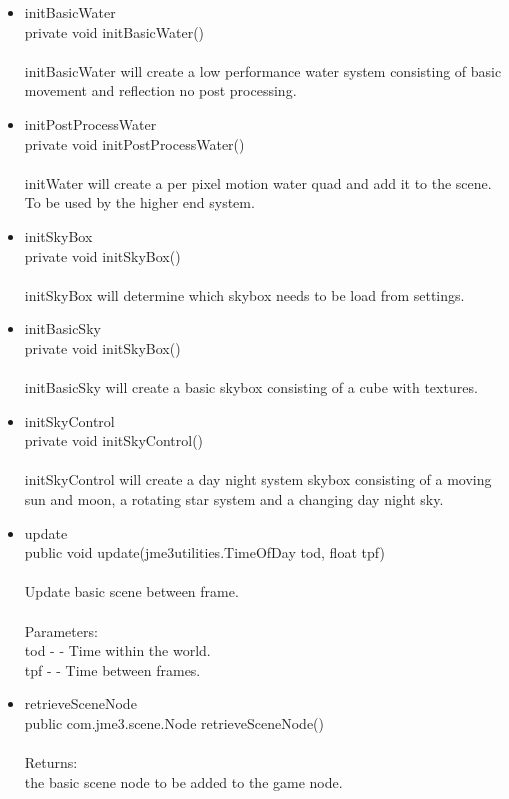 \documentclass[letterpaper]{article}
\begin{document}
\begin{itemize}
\begin{itemize}
											\item	initBasicWater \\
													private void initBasicWater() \\ \\
													initBasicWater will create a low performance water system consisting of basic movement and reflection no post processing. \\
											\item	initPostProcessWater \\
													private void initPostProcessWater() \\ \\
													initWater will create a per pixel motion water quad and add it to the scene. To be used by the higher end system. \\
											\item	initSkyBox \\
													private void initSkyBox() \\ \\ 
													initSkyBox will determine which skybox needs to be load from settings. \\
											\item	initBasicSky \\
													private void initSkyBox() \\ \\ 
													initBasicSky will create a basic skybox consisting of a cube with textures. \\
											\item	initSkyControl \\
													private void initSkyControl() \\ \\ 
													initSkyControl will create a day night system skybox consisting of a moving sun and moon, a rotating star system and a changing day night sky. \\
											\item	update \\
													public void update(jme3utilities.TimeOfDay tod,
				          float tpf) \\ \\
													Update basic scene between frame. \\ \\
													Parameters: \\
													tod - - Time within the world. \\
													tpf - - Time between frames. \\
											\item	retrieveSceneNode \\
													public com.jme3.scene.Node retrieveSceneNode() \\ \\
													Returns: \\
													the basic scene node to be added to the game node.
										\end{itemize}
							\end{itemize}
						
\end{document}
